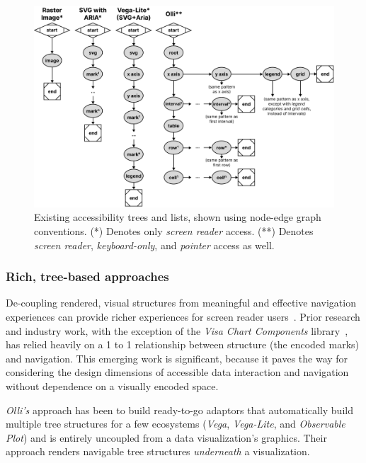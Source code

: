 \documentclass[journal]{vgtc}                %
\begin{document}
\begin{figure}[h]
  \centering
  \includegraphics[width=\linewidth]{figures/state-of-the-art.png}
  \caption{Existing accessibility trees and lists, shown using node-edge graph conventions. (*) Denotes only \textit{screen reader} access. (**) Denotes \textit{screen reader}, \textit{keyboard-only}, and \textit{pointer} access as well.}
  \label{existing}
\end{figure}

\subsubsection{Rich, tree-based approaches}
De-coupling rendered, visual structures from meaningful and effective navigation experiences can provide richer experiences for screen reader users~\cite{Zong2022Rich}. Prior research and industry work, with the exception of the \textit{Visa Chart Components} library~\cite{VisaVisa}, has relied heavily on a 1 to 1 relationship between structure (the encoded marks) and navigation. This emerging work is significant, because it paves the way for considering the design dimensions of accessible data interaction and navigation without dependence on a visually encoded space.

\textit{Olli's} approach has been to build ready-to-go adaptors that automatically build multiple tree structures for a few ecosystems (\textit{Vega}, \textit{Vega-Lite}, and \textit{Observable Plot}) and is entirely uncoupled from a data visualization's graphics. Their approach renders navigable tree structures \textit{underneath} a visualization.
\end{document}
